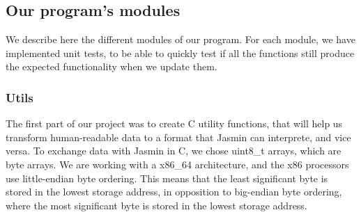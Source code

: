 \documentclass[runningheads]{llncs}
\begin{document}
\subsection{Our program's modules}

We describe here the different modules of our program. For each module, we have implemented unit tests, to be able to quickly test if all the functions still produce the expected functionality when we update them.

\subsubsection{Utils}
The first part of our project was to create C utility functions, that will help us transform human-readable data to a format that Jasmin can interprete, and vice versa. To exchange data with Jasmin in C, we chose uint8\_t arrays, which are byte arrays. We are working with a x86\_64 architecture, and the x86 processors use little-endian byte ordering. This means that the least significant byte is stored in the lowest storage address, in opposition to big-endian byte ordering, where the most significant byte is stored in the lowest storage address.
\end{document}
